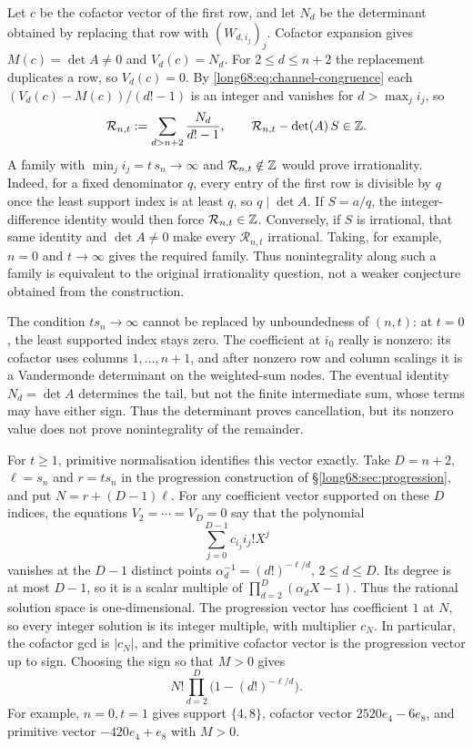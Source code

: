 \documentclass[11pt]{article}
\newcommand{\Ser}{S}
\newcommand{\chn}[2]{V_{#1}(#2)}
\begin{document}
Let $c$ be the cofactor vector of the first row, and let $N_d$ be the
determinant obtained by replacing that row with $(W_{d,i_j})_j$.
Cofactor expansion gives $M(c)=\det A\ne0$ and $\chn dc=N_d$.
For $2\le d\le n+2$ the replacement duplicates a row, so $\chn dc=0$.  By
\eqref{long68:eq:channel-congruence} each $(\chn dc-M(c))/(d!-1)$ is an integer and
vanishes for $d>\max_ji_j$, so
\[
 \mathcal R_{n,t}:=\sum_{d>n+2}\frac{N_d}{d!-1},\qquad
 \mathcal R_{n,t}-\det(A)\,\Ser\in\Z .
\]
A family with $\min_ji_j=t\,s_n\to\infty$ and
$\mathcal R_{n,t}\notin\mathbb{Z}$ would prove irrationality. Indeed, for a fixed
denominator $q$, every entry of the first row is divisible by $q$ once
the least support index is at least $q$, so $q\mid\det A$. If $S=a/q$,
the integer-difference identity would then force $\mathcal R_{n,t}\in\mathbb{Z}$.
Conversely, if $S$ is irrational, that same identity and $\det A\ne0$
make every $\mathcal R_{n,t}$ irrational. Taking, for example, $n=0$
and $t\to\infty$ gives the required family. Thus nonintegrality along
such a family is equivalent to the original irrationality question,
not a weaker conjecture obtained from the construction.

The condition $t s_n\to\infty$ cannot be replaced by unboundedness of
$(n,t)$: at $t=0$, the least supported index stays zero. The coefficient
at $i_0$ really is nonzero: its cofactor uses columns $1,\ldots,n+1$, and
after nonzero row and column scalings it is a Vandermonde determinant
on the weighted-sum nodes. The eventual
identity $N_d=\det A$ determines the tail, but not the finite intermediate
sum, whose terms may have either sign. Thus the determinant proves
cancellation, but its nonzero value does not prove nonintegrality of
the remainder.

For $t\ge1$, primitive normalisation identifies this vector exactly.
Take $D=n+2$, $\ell=s_n$ and $r=t s_n$ in the progression construction
of \S\ref{long68:sec:progression}, and put $N=r+(D-1)\ell$.
For any coefficient vector supported on these $D$ indices, the equations
$V_2=\cdots=V_D=0$ say that the polynomial
\[
 \sum_{j=0}^{D-1}c_{i_j}i_j!X^j
\]
vanishes at the $D-1$ distinct points
$\alpha_d^{-1}=(d!)^{-\ell/d}$, $2\le d\le D$.
Its degree is at most $D-1$, so it is a scalar multiple of
$\prod_{d=2}^D(\alpha_dX-1)$. Thus the rational solution space is
one-dimensional. The progression vector has coefficient $1$ at $N$,
so every integer solution is its integer multiple, with multiplier $c_N$.
In particular, the cofactor gcd is $|c_N|$, and the primitive cofactor
vector is the progression vector up to sign. Choosing the sign so that $M>0$ gives
\[
 N!\prod_{d=2}^D\bigl(1-(d!)^{-\ell/d}\bigr).
\]
For example, $n=0,t=1$ gives support $\{4,8\}$, cofactor vector
$2520e_4-6e_8$, and primitive vector $-420e_4+e_8$ with $M>0$.
\end{document}
